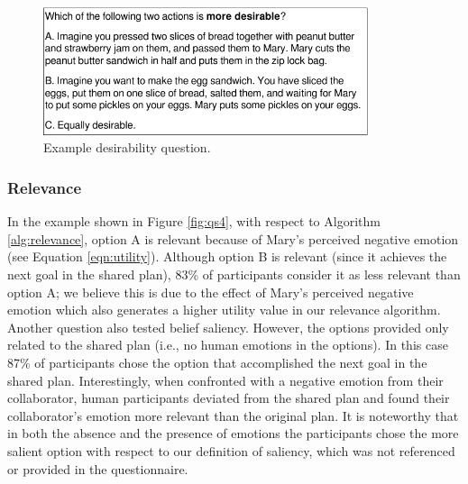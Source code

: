 \documentclass[12pt]{report}
\begin{document}
\begin{figure}[tbh]
  \centering
  \includegraphics[width=0.85\textwidth]{figure/question-sample3-croped.pdf}
  \caption{{Example desirability question.}}
  \label{fig:qs3}
\end{figure}

\subsubsection{Relevance}
\label{sec:relevance-crowdsourcing}
In the example shown in Figure \ref{fig:qs4}, with respect to Algorithm
\ref{alg:relevance}, option A is relevant because of Mary's perceived negative
emotion (see Equation \ref{eqn:utility}). Although option B is relevant (since
it achieves the next goal in the shared plan), 83\% of participants consider it as
less relevant than option A; we believe this is due to the effect of Mary's
perceived negative emotion which also generates a higher utility value in our
relevance algorithm. Another question also tested belief saliency. However, the
options provided only related to the shared plan (i.e., no human emotions in the
options). In this case 87\% of participants chose the option that accomplished the
next goal in the shared plan. Interestingly, when confronted with a negative
emotion from their collaborator, human participants deviated from the shared plan
and found their collaborator's emotion more relevant than the original plan. It
is noteworthy that in both the absence and the presence of emotions the
participants chose the more salient option with respect to our definition of
saliency, which was not referenced or provided in the questionnaire.
\end{document}
